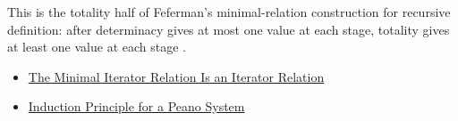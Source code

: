 \begin{remark*}[Interpretation]
This is the totality half of Feferman's minimal-relation construction for
recursive definition: after determinacy gives at most one value at each stage,
totality gives at least one value at each stage
\citep{FefermanNumberSystems1964}.
\end{remark*}

\begin{dependencies}
\begin{itemize}
  \item \hyperref[lem:iterator-relation-consistency]{The Minimal Iterator Relation Is an Iterator Relation}
  \item \hyperref[thm:induction-principle-for-peano-system]{Induction Principle for a Peano System}
\end{itemize}
\end{dependencies}


